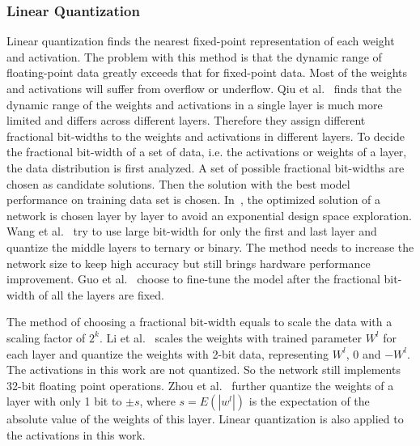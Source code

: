 \subsubsection{Linear Quantization}
Linear quantization finds the nearest fixed-point representation of each weight and activation. The problem with this method is that the dynamic range of floating-point data greatly exceeds that for fixed-point data. Most of the weights and activations will suffer from overflow or underflow. Qiu et al.~\cite{qiu2016going} finds that the dynamic range of the weights and activations in a single layer is much more limited and differs across different layers. Therefore they assign different fractional bit-widths to the weights and activations in different layers. To decide the fractional bit-width of a set of data, i.e. the activations or weights of a layer, the data distribution is first analyzed. A set of possible fractional bit-widths are chosen as candidate solutions. Then the solution with the best model performance on training data set is chosen. In~\cite{qiu2016going}, the optimized solution of a network is chosen layer by layer to avoid an exponential design space exploration. Wang et al.~\cite{wang2018design} try to use large bit-width for only the first and last layer and quantize the middle layers to ternary or binary. The method needs to increase the network size to keep high accuracy but still brings hardware performance improvement.  Guo et al.~\cite{guo2017angel} choose to fine-tune the model after the fractional bit-width of all the layers are fixed.  

The method of choosing a fractional bit-width equals to scale the data with a scaling factor of $2^k$. Li et al.~\cite{li2016ternary} scales the weights with trained parameter $W^l$ for each layer and quantize the weights with 2-bit data, representing $W^l$, 0 and $-W^l$. The activations in this work are not quantized. So the network still implements 32-bit floating point operations. Zhou et al.~\cite{zhou2016dorefa} further quantize the weights of a layer with only 1 bit to $\pm s$, where $s=E(|w^l|)$ is the expectation of the absolute value of the weights of this layer. Linear quantization is also applied to the activations in this work.

